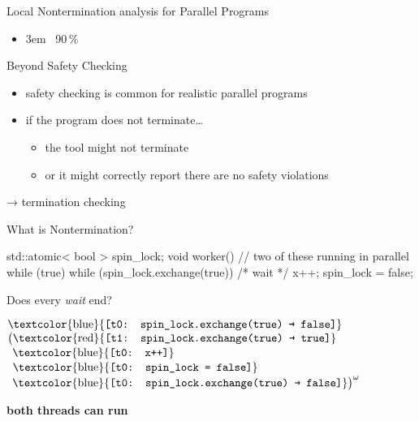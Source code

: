 \documentclass[aspectratio=169, fi]{paradise-slide}
\newcommand{\fcite}[1]{\emergencystretch 3em{\protect\NoHyper\cite{#1}}~\fullcite{#1}}
\newenvironment{prespart}[1]{%
  \begin{frame}{}%
    \centering
      {\Large #1} \par\bigskip\bigskip%
}{%
  \end{frame}%
}
\begin{document}
\begin{prespart}{Local Nontermination analysis for Parallel Programs}
  \begin{itemize}
    \item \fcite{SB2019} \hfill 90\,\%
  \end{itemize}
\end{prespart}

\begin{frame}{Beyond Safety Checking}
  \begin{itemize}
    \item safety checking is common for realistic parallel programs
    \item if the program does not terminate…
    \begin{itemize}
      \item the tool might not terminate
      \item or it might correctly report there are no safety violations
    \end{itemize}
  \end{itemize}

  \bigskip
  → termination checking
\end{frame}

\begin{frame}[fragile]{What is Nontermination?}
  \begin{cppcode}
  std::atomic< bool > spin_lock;
  void worker() { // two of these running in parallel
      while (true) {
          while (spin_lock.exchange(true)) { /* wait */ }
          x++;
          spin_lock = false;
      }
  }
  \end{cppcode}

  Does every \emph{wait} end? \pause

  \bigskip
  \newcommand{\ta}[1]{\text{\textcolor{blue}{\texttt{[t0: #1]}}}}
  \newcommand{\tb}[1]{\text{\textcolor{red}{\texttt{[t1: #1]}}}}
  $\ta{spin\_lock.exchange(true) \textrightarrow{} false}$\\
  $\big(\tb{spin\_lock.exchange(true) \textrightarrow{} true}$\\
  $\phantom{\big(}\ta{x++}$\\
  $\phantom{\big(}\ta{spin\_lock = false}$\\
  $\phantom{\big(}\ta{spin\_lock.exchange(true) \textrightarrow{} false}\big)^\omega$

  \medskip
  \textbf{both threads can run}
\end{frame}
\end{document}
